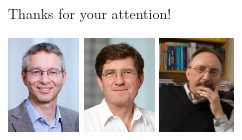 \documentclass[presentation,12pt]{beamer}
\begin{document}
\begin{frame}{Thanks for your attention!}
  
  \centering
  \includegraphics[height=2.5cm]{jbuhmann.jpeg} \hspace{3pt}
  \includegraphics[height=2.5cm]{widmayer.jpeg} \hspace{3pt}
  \includegraphics[height=2.5cm]{szpan.jpg} \\[5pt]


\end{frame}
\end{document}
